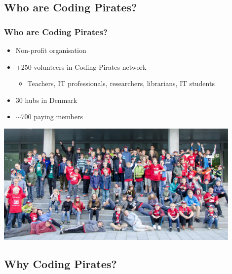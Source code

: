 \documentclass{beamer}
\begin{document}
\subsection{Who are Coding Pirates?}
\begin{frame}
\frametitle{Who are Coding Pirates?}
\begin{itemize}
\item Non-profit organisation
\item +250 volunteers in Coding Pirates network
  \begin{itemize}
  \item Teachers, IT professionals, researchers, librarians, IT students
  \end{itemize}
\item 30 hubs in Denmark
\item $\sim$700 paying members
\end{itemize}

\centerline{\includegraphics[width=0.9\textwidth]{imagery/gamejam}}
\end{frame}

\subsection{Why Coding Pirates?}
\end{document}
